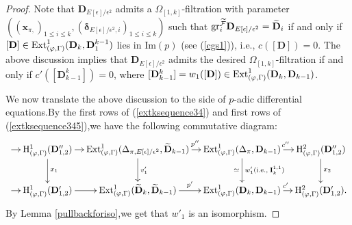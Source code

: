 \documentclass[SecEq,CM,GP]{degruyter-crelle} %
\theoremstyle{plain}
\newcommand{\Dpik}{{\mathbf{D}}}
\newcommand{\ext}{{\rm Ext}}
\newcommand{\gr}{{\rm gr}}
\newcommand{\hH}{{\mathrm{H}}}
\newcommand{\omepik}{\Omega_{[1,k]}}
\newcommand{\bx}{{\mathbf{x}}}
\newcommand{\cF}{\mathcal F}
\begin{document}
\begin{proof}
Note that  $\Dpik_{E[\epsilon]/\epsilon^2}$ admits  a $\omepik$-filtration with parameter $((\bx_{\pi,})_{1\leq i\leq k},(\bm{\delta}_{E[\epsilon]/\epsilon^2,i})_{1\leq i\leq k})$ such that $\gr^{\widetilde{\cF}}_{i}\Dpik_{E[\epsilon]/\epsilon^2}=\widetilde\Dpik_i$ if and only if  $[\Dpik]\in \ext^1_{(\varphi,\Gamma)}(\Dpik_{k},{\Dpik}_1^{k-1})$ lies in $\mathrm{Im}(p)$ (see (\ref{cgs1})), i.e., $c([\Dpik])=0$. The above discussion implies that $\Dpik_{E[\epsilon]/\epsilon^2}$ admits the desired $\omepik$-filtration if and only if $c'([\Dpik^k_{k-1}])=0$, where 
$[\Dpik^k_{k-1}]=w_1([\Dpik])\in  \ext^1_{(\varphi,\Gamma)}(\Dpik_k,\Dpik_{k-1})$.\;

We now translate the above discussion to the side of $p$-adic differential equations.\;By the first rows of (\ref{extksequence34}) and first rows of (\ref{extksequence345}),\;we have the following commutative diagram:
\begin{equation}\label{D12D12}
	\xymatrix@C=2.2ex{ \ar[r] & \hH^1_{(\varphi,\Gamma)}(\Dpik_{1,2}'') \ar[d]^{x_1}  \ar[r] & \ext^1_{(\varphi,\Gamma)}(\Delta_{\pi,E[\epsilon]/\epsilon^2},\widetilde{\Dpik}_{k-1}) \ar[d]^{v_1'}  \ar[r]^{\;\;\;\;\;p''}  & \ext^1_{(\varphi,\Gamma)}({\Delta_\pi},\Dpik_{k-1}) \ar[d]^{w_1'(\text{i.e.,\;}\mathbf{I}_{k}^{1,1})}_{\simeq} \ar[r]^{\;\;\;\;c''} & \hH^2_{(\varphi,\Gamma)}(\Dpik_{1,2}'') \ar[d]^{x_2}\\
		\ar[r] & \hH^1_{(\varphi,\Gamma)}(\Dpik_{1,2}')   \ar[r]
		& \ext^1_{(\varphi,\Gamma)}(\widetilde{\Dpik}_{k},\widetilde{\Dpik}_{k-1})  \ar[r]^{p'}  & \ext^1_{(\varphi,\Gamma)}(\Dpik_{k},\Dpik_{k-1})  \ar[r]^{\;\;\;\;c'}  & \hH^2_{(\varphi,\Gamma)}(\Dpik_{1,2}')
		.}
\end{equation}
By Lemma \ref{pullbackforiso},\;we get that $w'_1$ is an isomorphism.\;


\end{proof}
\end{document}
